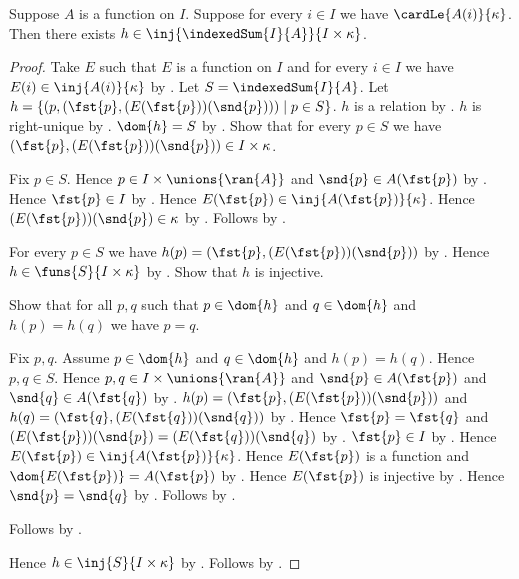 \begin{theorem}\label{indexed_sum_injection_into_product}
    Suppose $A$ is a function on $I$.
    Suppose for every $i\in I$ we have $\cardLe{A(i)}{\kappa}$.
    Then there exists $h\in\inj{\indexedSum{I}{A}}{I\times\kappa}$.
\end{theorem}
\begin{proof}
    Take $E$ such that $E$ is a function on $I$ and
        for every $i\in I$ we have $E(i)\in\inj{A(i)}{\kappa}$
        by .
    Let $S=\indexedSum{I}{A}$.
    Let $h=\{(p,(\fst{p},(E(\fst{p}))(\snd{p})))\mid p\in S\}$.
    $h$ is a relation by .
    $h$ is right-unique by .
    $\dom{h}=S$ by .
    Show that for every $p\in S$ we have
        $(\fst{p},(E(\fst{p}))(\snd{p}))\in I\times\kappa$.
    \begin{subproof}
        Fix $p\in S$.
        Hence $p\in I\times\unions{\ran{A}}$ and
            $\snd{p}\in A(\fst{p})$ by .
        Hence $\fst{p}\in I$ by .
        Hence $E(\fst{p})\in\inj{A(\fst{p})}{\kappa}$.
        Hence $(E(\fst{p}))(\snd{p})\in\kappa$
            by .
        Follows by .
    \end{subproof}
    For every $p\in S$ we have
        $h(p)=(\fst{p},(E(\fst{p}))(\snd{p}))$
        by .
    Hence $h\in\funs{S}{I\times\kappa}$ by .
    Show that $h$ is injective.
    \begin{subproof}
        Show that for all $p,q$ such that $p\in\dom{h}$ and
            $q\in\dom{h}$ and $h(p)=h(q)$ we have $p=q$.
        \begin{subproof}
            Fix $p,q$.
            Assume $p\in\dom{h}$ and $q\in\dom{h}$ and $h(p)=h(q)$.
            Hence $p,q\in S$.
            Hence $p,q\in I\times\unions{\ran{A}}$ and
                $\snd{p}\in A(\fst{p})$ and
                $\snd{q}\in A(\fst{q})$ by .
            $h(p)=(\fst{p},(E(\fst{p}))(\snd{p}))$ and
                $h(q)=(\fst{q},(E(\fst{q}))(\snd{q}))$
                by .
            Hence $\fst{p}=\fst{q}$ and
                $(E(\fst{p}))(\snd{p})
                    =(E(\fst{q}))(\snd{q})$
                by .
            $\fst{p}\in I$ by .
            Hence $E(\fst{p})\in\inj{A(\fst{p})}{\kappa}$.
            Hence $E(\fst{p})$ is a function and
                $\dom{E(\fst{p})}=A(\fst{p})$
                by .
            Hence $E(\fst{p})$ is injective
                by .
            Hence $\snd{p}=\snd{q}$
                by .
            Follows by
                .
        \end{subproof}
        Follows by .
    \end{subproof}
    Hence $h\in\inj{S}{I\times\kappa}$
        by .
    Follows by \auto.
\end{proof}

